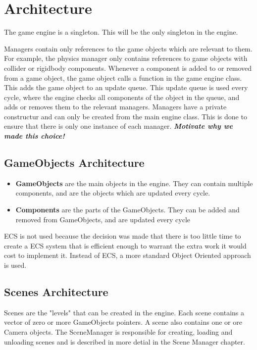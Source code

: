 \section{Architecture}
\label{sec:architecture}
The game engine is a singleton. This will be the only singleton in the engine.

Managers contain only references to the game objects which are relevant to them. For example, the physics manager only contains references to game objects with collider or rigidbody components.
Whenever a component is added to or removed from a game object, the game object calls a function in the game engine class. This adds the game object to an update queue. This update queue is used every cycle, where the engine checks all components of the object in the queue, and adds or removes them to the relevant managers.
Managers have a private constructur and can only be created from the main engine class. This is done to ensure that there is only one instance of each manager.
\textbf{\textit{Motivate why we made this choice!}}

\subsection{GameObjects Architecture}
\begin{itemize}
    \item \textbf{GameObjects} are the main objects in the engine. They can contain multiple components, and are the objects which are updated every cycle.
    \item \textbf{Components} are the parts of the GameObjects. They can be added and removed from GameObjects, and are updated every cycle
\end{itemize}
ECS is not used because the decision was made that there is too little time to create a ECS system that is efficient enough to warrant the extra work it would cost to implement it.
Instead of ECS, a more standard Object Oriented approach is used.

\subsection{Scenes Architecture}
Scenes are the "levels" that can be created in the engine. Each scene contains a vector of zero or more GameObjects pointers.
A scene also contains one or ore Camera objects.
The SceneManager is responsible for creating, loading and unloading scenes and is described in more detial in the Scene Manager chapter.













